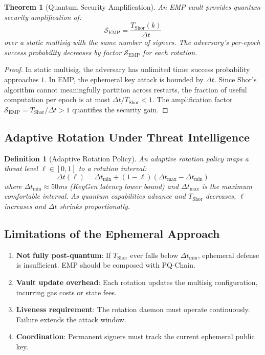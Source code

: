 \documentclass[12pt, a4paper, twocolumn]{article}
\newtheorem{definition}{Definition}
\newtheorem{theorem}{Theorem}
\begin{document}
\begin{theorem}[Quantum Security Amplification]
\label{thm:amplification}
An EMP vault provides quantum security amplification of:
\[
\mathcal{S}_{\text{EMP}} = \frac{T_{\text{Shor}}(k)}{\Delta t}
\]
over a static multisig with the same number of signers. The adversary's per-epoch success probability decreases by factor $\mathcal{S}_{\text{EMP}}$ for each rotation.
\end{theorem}

\begin{proof}
In static multisig, the adversary has unlimited time: success probability approaches $1$. In EMP, the ephemeral key attack is bounded by $\Delta t$. Since Shor's algorithm cannot meaningfully partition across restarts, the fraction of useful computation per epoch is at most $\Delta t / T_{\text{Shor}} < 1$. The amplification factor $\mathcal{S}_{\text{EMP}} = T_{\text{Shor}} / \Delta t > 1$ quantifies the security gain.
\end{proof}

\subsection{Adaptive Rotation Under Threat Intelligence}

\begin{definition}[Adaptive Rotation Policy]
An adaptive rotation policy maps a threat level $\ell \in [0, 1]$ to a rotation interval:
\[
\Delta t(\ell) = \Delta t_{\min} + (1 - \ell)(\Delta t_{\max} - \Delta t_{\min})
\]
where $\Delta t_{\min} \approx 50$ms (KeyGen latency lower bound) and $\Delta t_{\max}$ is the maximum comfortable interval. As quantum capabilities advance and $T_{\text{Shor}}$ decreases, $\ell$ increases and $\Delta t$ shrinks proportionally.
\end{definition}

\subsection{Limitations of the Ephemeral Approach}

\begin{enumerate}[noitemsep]
  \item \textbf{Not fully post-quantum}: If $T_{\text{Shor}}$ ever falls below $\Delta t_{\min}$, ephemeral defense is insufficient. EMP should be composed with PQ-Chain.
  \item \textbf{Vault update overhead}: Each rotation updates the multisig configuration, incurring gas costs or state fees.
  \item \textbf{Liveness requirement}: The rotation daemon must operate continuously. Failure extends the attack window.
  \item \textbf{Coordination}: Permanent signers must track the current ephemeral public key.
\end{enumerate}
\end{document}
